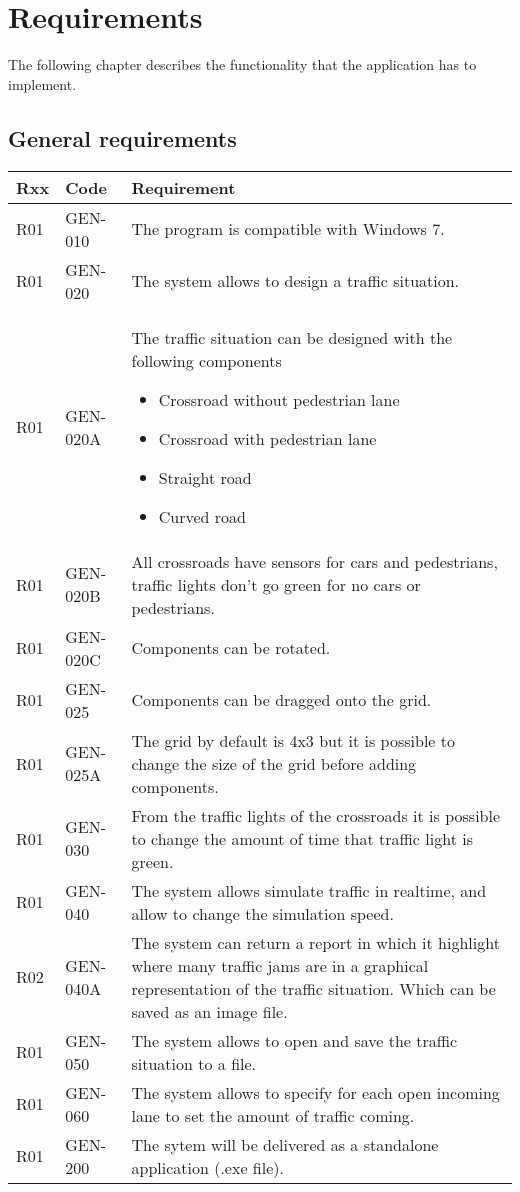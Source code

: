 \section{Requirements}
The following chapter describes the functionality that the application has to implement.
\subsection{General requirements}
\begin{tabularx}{\textwidth}{|p{0.5cm}p{2cm}X|}\hline
	Rxx & Code & Requirement \\\hline
	R01 & GEN-010 & The program is compatible with Windows 7.\\\hline
	R01 & GEN-020 & The system allows to design a traffic situation.\\\hline
	R01 & GEN-020A & The traffic situation can be designed with the following components
	\begin{itemize}[noitemsep,nolistsep]
		\item Crossroad without pedestrian lane
		\item Crossroad with pedestrian lane
		\item Straight road
		\item Curved road
	\end{itemize}\\\hline
	R01 & GEN-020B & All crossroads have sensors for cars and pedestrians, traffic lights don't go green for no cars or pedestrians.\\\hline
	R01 & GEN-020C & Components can be rotated.\\\hline
	R01 & GEN-025 & Components can be dragged onto the grid.\\\hline
	R01 & GEN-025A & The grid by default is 4x3 but it is possible to change the size of the grid before adding components.\\\hline
	R01 & GEN-030 & From the traffic lights of the crossroads it is possible to change the amount of time that traffic light is green.\\\hline
	R01 & GEN-040 & The system allows simulate traffic in realtime, and allow to change the simulation speed.\\\hline
	R02 & GEN-040A & The system can return a report in which it highlight where many traffic jams are in a graphical representation of the traffic situation. Which can be saved as an image file.\\\hline
	R01 & GEN-050 & The system allows to open and save the traffic situation to a file.\\\hline
	R01 & GEN-060 & The system allows to specify for each open incoming lane to set the amount of traffic coming.\\\hline
	R01 & GEN-200 & The sytem will be delivered as a standalone application (.exe file).\\\hline
\end{tabularx}

